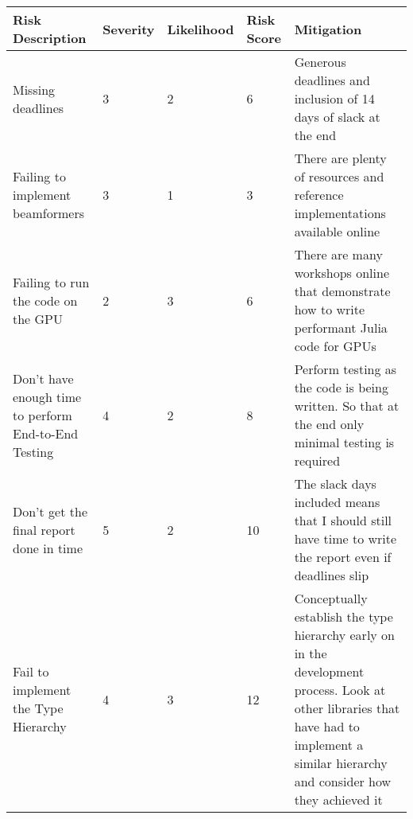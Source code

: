 \begin{tabularx}{\textwidth}{@{}|X|P{1.7cm}|P{1.7cm}|P{1.7cm}|X|@{}}
    \hline
    \centering \textbf{Risk Description} & \textbf{Severity} & \centering \textbf{Likelihood} & \textbf{Risk Score} & \centering\arraybackslash \textbf{Mitigation} \\
    \hline
    Missing deadlines & 3 & 2 &  6 & Generous deadlines and inclusion of 14 days of slack at the end \\
    \hline
    Failing to implement beamformers & 3 & 1 &  3 & There are plenty of resources and reference implementations available online \\
    \hline
    Failing to run the code on the GPU & 2 & 3 &  6 & There are many workshops online that demonstrate how to write performant Julia code for GPUs \\
    \hline
    Don't have enough time to perform End-to-End Testing & 4 & 2 &  8 & Perform testing as the code is being written. So that at the end only minimal testing is required \\
    \hline
    Don't get the final report done in time & 5 & 2 &  10 & The slack days included means that I should still have time to write the report even if deadlines slip \\
    \hline
    Fail to implement the Type Hierarchy & 4 & 3 &  12 & Conceptually establish the type hierarchy early on in the development process. Look at other libraries that have had to implement a similar hierarchy and consider how they achieved it \\
    \hline
\end{tabularx}
